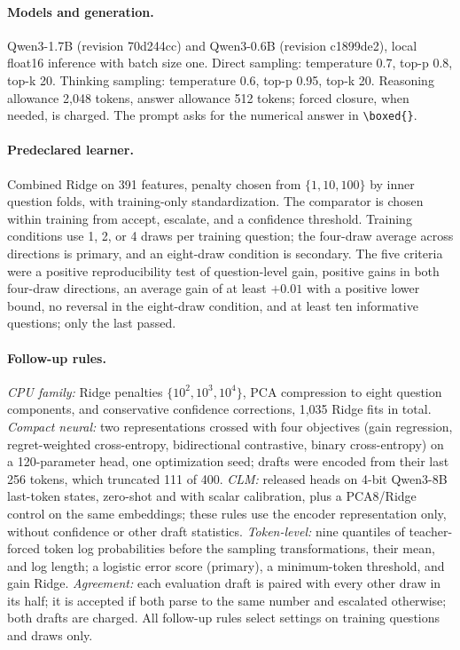 \documentclass[10pt,letterpaper]{article}
\begin{document}
\paragraph{Models and generation.} Qwen3-1.7B (revision 70d244cc) and Qwen3-0.6B (revision c1899de2), local float16 inference with batch size one. Direct sampling: temperature 0.7, top-p 0.8, top-k 20. Thinking sampling: temperature 0.6, top-p 0.95, top-k 20. Reasoning allowance 2,048 tokens, answer allowance 512 tokens; forced closure, when needed, is charged. The prompt asks for the numerical answer in \verb|\boxed{}|.

\paragraph{Predeclared learner.} Combined Ridge on 391 features, penalty chosen from $\{1, 10, 100\}$ by inner question folds, with training-only standardization. The comparator is chosen within training from accept, escalate, and a confidence threshold. Training conditions use 1, 2, or 4 draws per training question; the four-draw average across directions is primary, and an eight-draw condition is secondary. The five criteria were a positive reproducibility test of question-level gain, positive gains in both four-draw directions, an average gain of at least $+0.01$ with a positive lower bound, no reversal in the eight-draw condition, and at least ten informative questions; only the last passed.

\paragraph{Follow-up rules.} \emph{CPU family:} Ridge penalties $\{10^2, 10^3, 10^4\}$, PCA compression to eight question components, and conservative confidence corrections, 1,035 Ridge fits in total. \emph{Compact neural:} two representations crossed with four objectives (gain regression, regret-weighted cross-entropy, bidirectional contrastive, binary cross-entropy) on a 120-parameter head, one optimization seed; drafts were encoded from their last 256 tokens, which truncated 111 of 400. \emph{CLM:} released heads on 4-bit Qwen3-8B last-token states, zero-shot and with scalar calibration, plus a PCA8/Ridge control on the same embeddings; these rules use the encoder representation only, without confidence or other draft statistics. \emph{Token-level:} nine quantiles of teacher-forced token log probabilities before the sampling transformations, their mean, and log length; a logistic error score (primary), a minimum-token threshold, and gain Ridge. \emph{Agreement:} each evaluation draft is paired with every other draw in its half; it is accepted if both parse to the same number and escalated otherwise; both drafts are charged. All follow-up rules select settings on training questions and draws only.
\end{document}
